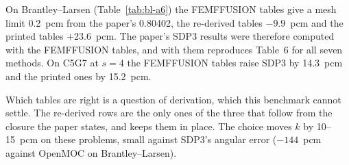 On Brantley--Larsen (Table~\ref{tab:bl-a6}) the FEMFFUSION tables give a
mesh limit 0.2~pcm from the paper's 0.80402, the re-derived tables
$-9.9$~pcm and the printed tables $+23.6$~pcm. The paper's SDP3 results were
therefore computed with the FEMFFUSION tables, and with them \garnet{}
reproduces Table~6 for all seven methods. On C5G7 at $s = 4$ the FEMFFUSION
tables raise SDP3 by 14.3~pcm and the printed ones by 15.2~pcm.

Which tables are right is a question of derivation, which this benchmark
cannot settle. The re-derived rows are the only ones of the three that follow
from the closure the paper states, and
 keeps them in place. The
choice moves $k$ by 10--15~pcm on these problems, small against SDP3's
angular error ($-144$~pcm against OpenMOC on Brantley--Larsen).
